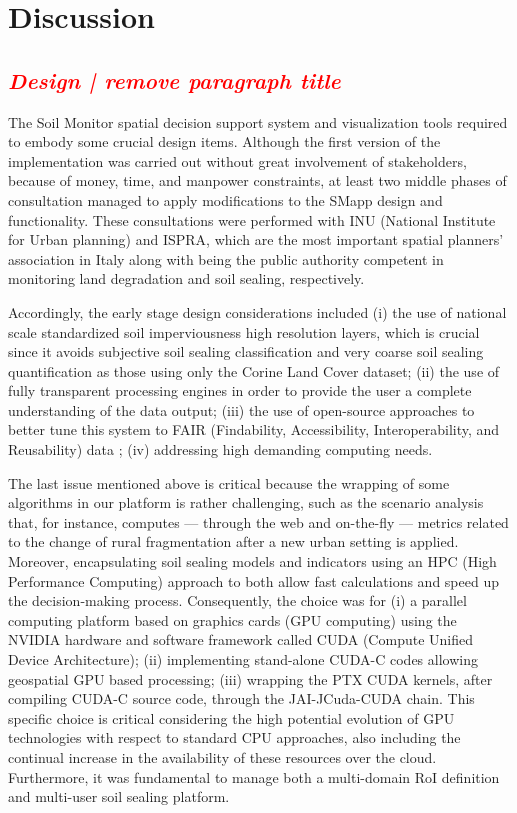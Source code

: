 \documentclass[APA,LATO1COL,doublespace]{WileyNJD-v2}
\newcommand{\toberevised}[1]{\emph{\textcolor{red}{#1}}} %
\begin{document}
\section{Discussion}

\subsection{ \toberevised{Design | remove paragraph title} }
The Soil Monitor spatial decision support system and visualization tools required to embody some crucial design items. 
Although the first version of the implementation was carried out without great involvement of stakeholders, because of money, time, and manpower constraints, at least two middle phases of consultation managed to apply modifications to the SMapp design and functionality. 
These consultations were performed with INU (National Institute for Urban planning) and ISPRA, which are the most important spatial planners' association in Italy along with being the public authority competent in monitoring land degradation and soil sealing, respectively.

Accordingly, the early stage design considerations included (i) the use of national scale standardized soil imperviousness high resolution layers, which is crucial since it avoids subjective soil sealing classification and very coarse soil sealing quantification as those using only the Corine Land Cover dataset; (ii) the use of fully transparent processing engines in order to provide the user a complete understanding of the data output; (iii) the use of open-source approaches to better tune this system to FAIR (Findability, Accessibility, Interoperability, and Reusability) data ; (iv) addressing high demanding computing needs.

The last issue mentioned above is critical because the wrapping of some algorithms in our platform is rather challenging, such as the scenario analysis that, for instance, computes --- through the web and on-the-fly --- metrics related to the change of rural fragmentation after a new urban setting is applied.
Moreover, encapsulating soil sealing models and indicators using an HPC (High Performance Computing) approach to both allow fast calculations and speed up the decision-making process. Consequently, the choice was for (i) a parallel computing platform based on graphics cards (GPU computing) using the NVIDIA hardware and software framework called CUDA (Compute Unified Device Architecture); (ii) implementing stand-alone CUDA-C codes allowing geospatial GPU based processing; (iii) wrapping the PTX CUDA kernels, after compiling CUDA-C source code, through the JAI-JCuda-CUDA chain. This specific choice is critical considering the high potential evolution of GPU technologies with respect to standard CPU approaches, also including the continual increase in the availability of these resources over the cloud. 
Furthermore, it was fundamental to manage both a multi-domain RoI definition and multi-user soil sealing platform.
\end{document}
